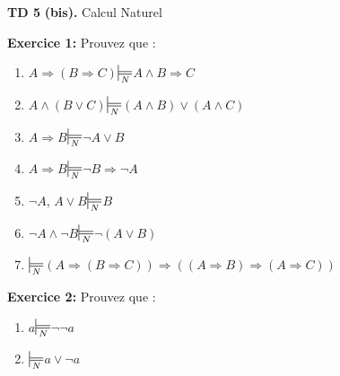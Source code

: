 \documentclass[10pt,a4]{article}
\newcommand{\dednat}[2]{#1\hspace{10pt}$\sdtstile{N}{}$\hspace{10pt}#2}
\newcommand{\Dednat}[1]{$\sdtstile{N}{}$\hspace{10pt}#1}
\newcommand{\imp}{\Rightarrow}
\begin{document}
\begin{center}
{\Large{\bf TD 5}} \textbf{(bis).} \Large{\sc Calcul Naturel}
\end{center}

{\bf{{\large Exercice 1:}} } Prouvez que :
\begin{enumerate}
\item \dednat{$A\Rightarrow(B\imp C)$}{$A\land B\Rightarrow C$}
\item \dednat{$A\land (B\lor C)$}{$(A\land B)\lor(A\land C)$}
\item \dednat{$A\imp B$}{$\neg A \lor B$}
\item \dednat{$A \imp B$}{$\neg B \imp \neg A$}
\item \dednat{$\neg A$, $A\lor B$}{$B$}
\item \dednat{$\neg A \land \neg B$}{$\neg (A \lor B)$}
\item \Dednat{$\left(A\imp (B\imp C)\right) \imp \left((A\imp B)\imp(A\imp C)\right)$}
\end{enumerate}

{\bf{{\large Exercice 2:}} } Prouvez que :
\begin{enumerate}
\item \dednat{$a$}{$\neg \neg a$}
\item \Dednat{$a\lor \neg a$}
\end{enumerate}
\end{document}
